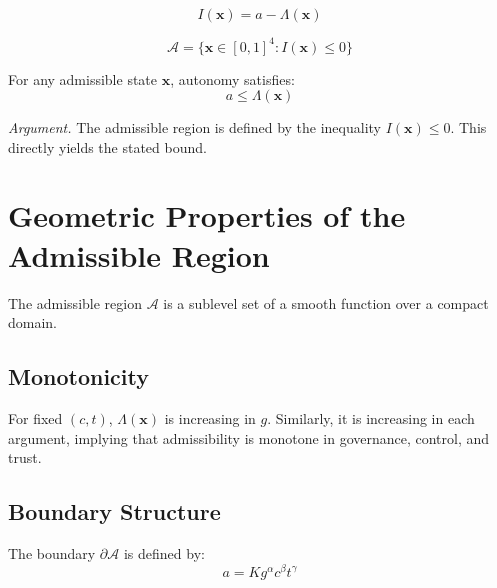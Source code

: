 \documentclass[letterpaper, 10 pt, conference]{ieeeconf}
\begin{document}
\begin{definition}
\begin{equation}
I(\mathbf{x}) = a - \Lambda(\mathbf{x})
\end{equation}
\end{definition}

\begin{definition}
\begin{equation}
\mathcal{A} = \{ \mathbf{x} \in [0,1]^4 : I(\mathbf{x}) \le 0 \}
\end{equation}
\end{definition}

\begin{theorem}
For any admissible state $\mathbf{x}$, autonomy satisfies:
\begin{equation}
a \le \Lambda(\mathbf{x})
\end{equation}
\end{theorem}

\textit{Argument.}
The admissible region is defined by the inequality $I(\mathbf{x}) \le 0$. This directly yields the stated bound.

\section{Geometric Properties of the Admissible Region}

The admissible region $\mathcal{A}$ is a sublevel set of a smooth function over a compact domain.

\subsection{Monotonicity}

For fixed $(c,t)$, $\Lambda(\mathbf{x})$ is increasing in $g$. Similarly, it is increasing in each argument, implying that admissibility is monotone in governance, control, and trust.

\subsection{Boundary Structure}

The boundary $\partial \mathcal{A}$ is defined by:
\begin{equation}
a = K g^\alpha c^\beta t^\gamma
\end{equation}
\end{document}
